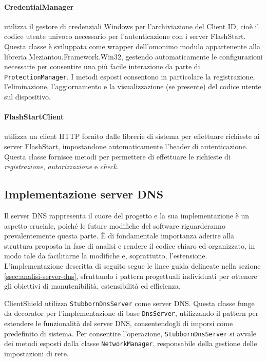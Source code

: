 \documentclass[12pt,a4paper,openright,twoside]{book}
\newcommand{\class}[1]{\texttt{#1}}
\begin{document}
\paragraph {CredentialManager} utilizza il gestore di credenziali Windows per l'archiviazione del Client ID, cioè il codice utente univoco necessario per l'autenticazione con i server FlashStart.
Questa classe è sviluppata come wrapper dell'omonimo modulo appartenente alla libreria Meziantou.Framework.Win32, gestendo automaticamente le configurazioni necessarie per consentire una più facile interazione da parte di \class{ProtectionManager}.
I metodi esposti consentono in particolare la registrazione, l'eliminazione, l'aggiornamento e la visualizzazione (se presente) del codice utente sul dispositivo.\\

\paragraph{FlashStartClient} utilizza un client HTTP fornito dalle librerie di sistema per effettuare richieste ai server FlashStart, impostandone automaticamente l'header di autenticazione.
Questa classe fornisce metodi per permettere di effettuare le richieste di \textit{registrazione}, \textit{autorizzazione} e \textit{check}.

\subsection{Implementazione server DNS}

Il server \gls{DNS} rappresenta il cuore del progetto e la sua implementazione è un aspetto cruciale, poiché le future modifiche del software riguarderanno prevalentemente questa parte.  
È di fondamentale importanza aderire alla struttura proposta in fase di analisi e rendere il codice chiaro ed organizzato, in modo tale da facilitarne la modifiche e, soprattutto, l'estensione.
L'implementazione descritta di seguito segue le linee guida delineate nella sezione \ref{ssec:analisi-server-dns}, sfruttando i pattern progettuali individuati per ottenere gli obiettivi di manutenibilità, estensibilità ed efficienza.

ClientShield utilizza \class{StubbornDnsServer} come server \gls{DNS}.
Questa classe funge da decorator per l'implementazione di base \class{DnsServer}, utilizzando il pattern per estendere le funzionalità del server \gls{DNS}, consentendogli di imporsi come predefinito di sistema.
Per consentire l'operazione, \class{StubbornDnsServer} si avvale dei metodi esposti dalla classe \class{NetworkManager}, responsabile della gestione delle impostazioni di rete.  
\end{document}
